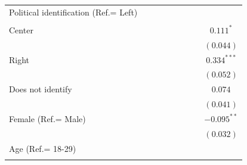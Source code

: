 \documentclass[
  12pt,
]{article}
\begin{document}
\begin{table}
\begin{center}
{\begin{tabular}{l c c c c c c c c}
Political identification (Ref.= Left)                 &               &                &                &                &                &                &                &                \\
                                                      &               &                &                &                &                &                &                &                \\
\quad Center                                          &               &                &                &                &                &                &                & $0.111^{*}$    \\
                                                      &               &                &                &                &                &                &                & $(0.044)$      \\
\quad Right                                           &               &                &                &                &                &                &                & $0.334^{***}$  \\
                                                      &               &                &                &                &                &                &                & $(0.052)$      \\
\quad Does not identify                               &               &                &                &                &                &                &                & $0.074$        \\
                                                      &               &                &                &                &                &                &                & $(0.041)$      \\
Female (Ref.= Male)                                   &               &                &                &                &                &                &                & $-0.095^{**}$  \\
                                                      &               &                &                &                &                &                &                & $(0.032)$      \\
Age (Ref.= 18-29)                                     &               &                &                &                &                &                &                &                \\
                                                      &               &                &                &                &                &                &                &                \\

\end{tabular}}
\end{center}
\end{table}
\end{document}
